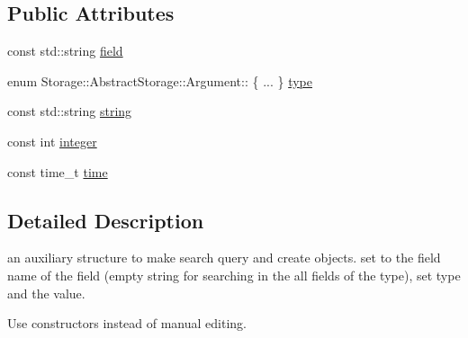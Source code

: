 \subsection*{Public Attributes}
\begin{DoxyCompactItemize}
\item 
const std::string \hyperlink{structStorage_1_1AbstractStorage_1_1Argument_ad48a91372dd1a9445b4ddcee0bc8336a}{field}
\item 
enum Storage::AbstractStorage::Argument:: \{ ... \}  \hyperlink{structStorage_1_1AbstractStorage_1_1Argument_a77f04e835f26305c4222df78c07f8efd}{type}
\item 
const std::string \hyperlink{structStorage_1_1AbstractStorage_1_1Argument_ab8ea8281cdefeb901a267261ed2e0478}{string}
\item 
const int \hyperlink{structStorage_1_1AbstractStorage_1_1Argument_a6b20329db4720c44c45d8380f840dbec}{integer}
\item 
const time\_\-t \hyperlink{structStorage_1_1AbstractStorage_1_1Argument_ae6cc69656647a6cccf725a0156373a51}{time}
\end{DoxyCompactItemize}


\subsection{Detailed Description}
an auxiliary structure to make search query and create objects. set to the field name of the field (empty string for searching in the all fields of the type), set type and the value.

Use constructors instead of manual editing. 

